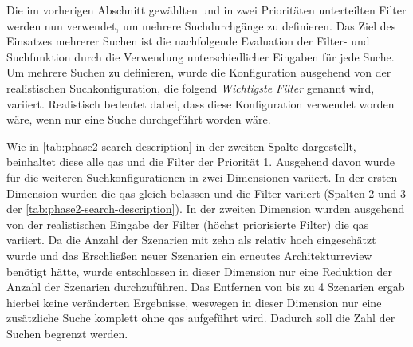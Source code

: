 Die im vorherigen Abschnitt gewählten und in zwei Prioritäten unterteilten Filter werden nun verwendet, um mehrere Suchdurchgänge zu definieren.
Das Ziel des Einsatzes mehrerer Suchen ist die nachfolgende Evaluation der Filter- und Suchfunktion durch die Verwendung unterschiedlicher Eingaben für jede Suche.
Um mehrere Suchen zu definieren, wurde die Konfiguration ausgehend von der realistischen Suchkonfiguration, die folgend \emph{Wichtigste Filter} genannt wird, variiert.
Realistisch bedeutet dabei, dass diese Konfiguration verwendet worden wäre, wenn nur eine Suche durchgeführt worden wäre.

Wie in \cref{tab:phase2-search-description} in der zweiten Spalte dargestellt, beinhaltet diese alle \glspl{qa} und die Filter der Priorität 1.
Ausgehend davon wurde für die weiteren Suchkonfigurationen in zwei Dimensionen variiert.
In der ersten Dimension wurden die \glspl{qa} gleich belassen und die Filter variiert (Spalten 2 und 3 der \cref{tab:phase2-search-description}).
In der zweiten Dimension wurden ausgehend von der realistischen Eingabe der Filter (höchst priorisierte Filter) die \glspl{qa} variiert.
Da die Anzahl der Szenarien mit zehn als relativ hoch eingeschätzt wurde und das Erschließen neuer Szenarien ein erneutes Architekturreview benötigt hätte, wurde entschlossen in dieser Dimension nur eine Reduktion der Anzahl der Szenarien durchzuführen.
Das Entfernen von bis zu 4 Szenarien ergab hierbei keine veränderten Ergebnisse, weswegen in dieser Dimension nur eine zusätzliche Suche komplett ohne \glspl{qa} aufgeführt wird.
Dadurch soll die Zahl der Suchen begrenzt werden.


